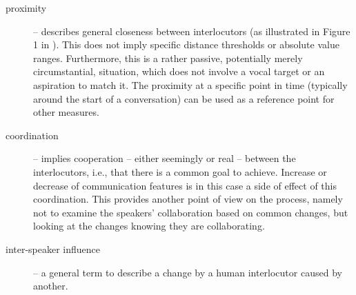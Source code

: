\begin{description}
	\item[proximity] -- describes general closeness between interlocutors (as illustrated in Figure 1 in \citet{Levitan2011measuring}).
	This does not imply specific distance thresholds or absolute value ranges.
	Furthermore, this is a rather passive, potentially merely circumstantial, situation, which does not involve a vocal target or an aspiration to match it.
	The proximity at a specific point in time (typically around the start of a conversation) can be used as a reference point for other measures.
	
	\item[coordination] -- implies cooperation -- either seemingly or real -- between the interlocutors, i.e., that there is a common goal to achieve.
	Increase or decrease of communication features is in this case a side of effect of this coordination.
	This provides another point of view on the process, namely not to examine the speakers' collaboration based on common changes, but looking at the changes knowing they are collaborating.
	
	\item[inter-speaker influence] -- a general term to describe a change by a human interlocutor caused by another.
\end{description}

